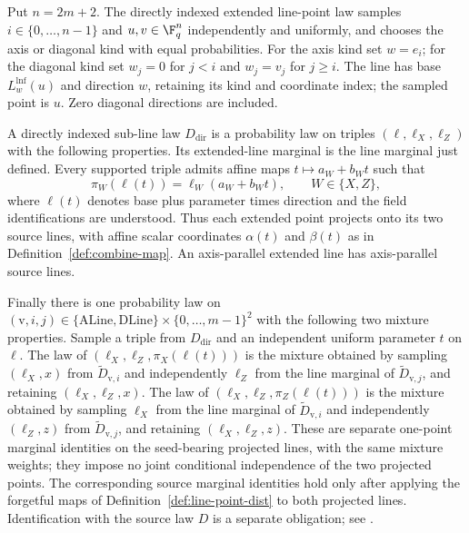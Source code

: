 \begin{definition}
	\label{def:direct-subline-law}
	\leanok
	Put $n=2m+2$. The directly indexed extended line-point law samples
	$i\in\{0,\dots,n-1\}$ and $u,v\in\F_q^n$ independently and uniformly,
	and chooses the axis or diagonal kind with equal probabilities.
	For the axis kind set $w=e_i$; for the diagonal kind set $w_j=0$ for
	$j<i$ and $w_j=v_j$ for $j\ge i$. The line has base $L_w^{\mathrm{lnf}}(u)$
	and direction $w$, retaining its kind and coordinate index; the sampled
	point is $u$. Zero diagonal directions are included.

	A directly indexed sub-line law $D_{\mathrm{dir}}$ is a probability law
	on triples $(\ell,\ell_X,\ell_Z)$ with the following properties.
	Its extended-line marginal is the line marginal just defined.
	Every supported triple admits affine maps $t\mapsto a_W+b_Wt$ such that
	\[
		\pi_W(\ell(t))=\ell_W(a_W+b_Wt),\qquad W\in\{X,Z\},
	\]
	where $\ell(t)$ denotes base plus parameter times direction and the
	field identifications are understood. Thus each extended point projects
	onto its two source lines, with affine scalar coordinates $\alpha(t)$
	and $\beta(t)$ as in Definition~\ref{def:combine-map}. An axis-parallel
	extended line has axis-parallel source lines.

	Finally there is one probability law on
	$(\mathrm v,i,j)\in\{\mathrm{ALine},\mathrm{DLine}\}
	\times\{0,\dots,m-1\}^2$ with the following two mixture properties.
	Sample a triple from $D_{\mathrm{dir}}$ and an independent uniform
	parameter $t$ on $\ell$. The law of $(\ell_X,\ell_Z,\pi_X(\ell(t)))$
	is the mixture obtained by sampling $(\ell_X,x)$ from
	$\widetilde D_{\mathrm v,i}$ and independently $\ell_Z$ from the line
	marginal of $\widetilde D_{\mathrm v,j}$, and retaining
	$(\ell_X,\ell_Z,x)$.
	The law of $(\ell_X,\ell_Z,\pi_Z(\ell(t)))$ is the mixture obtained
	by sampling $\ell_X$ from the line marginal of
	$\widetilde D_{\mathrm v,i}$ and independently $(\ell_Z,z)$ from
	$\widetilde D_{\mathrm v,j}$, and retaining $(\ell_X,\ell_Z,z)$.
	These are separate one-point marginal identities on the seed-bearing
	projected lines, with the same mixture weights; they impose no joint
	conditional independence of the two projected points. The corresponding
	source marginal identities hold only after applying the forgetful maps
	of Definition~\ref{def:line-point-dist} to both projected lines.
	Identification with the source law $D$ is a separate obligation;
	see \cite{gap:qpbt_ld-dimension-divisibility}.
\end{definition}

